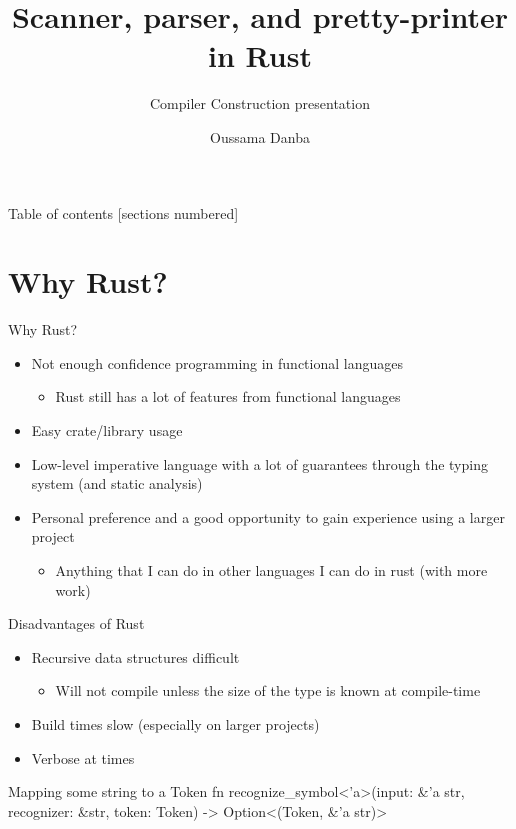\documentclass[10pt]{beamer}
\title{Scanner, parser, and pretty-printer in Rust}
\subtitle{Compiler Construction presentation}
\date{}
\author{Oussama Danba}
\begin{document}
\maketitle

\begin{frame}{Table of contents}
  [sections numbered]
  \tableofcontents[hideallsubsections]
\end{frame}

\section{Why Rust?}
\begin{frame}{Why Rust?}
    \begin{itemize}
    \item Not enough confidence programming in functional languages
        \begin{itemize}
            \item Rust still has a lot of features from functional languages
        \end{itemize}
    \item Easy crate/library usage
    \item Low-level imperative language with a lot of guarantees through the typing system (and static analysis)
    \item Personal preference and a good opportunity to gain experience using a larger project
        \begin{itemize}
            \item Anything that I can do in other languages I can do in rust (with more work)
        \end{itemize}
\end{itemize}
\end{frame}

\begin{frame}{Disadvantages of Rust}
    \begin{itemize}
        \item Recursive data structures difficult
            \begin{itemize}
                \item Will not compile unless the size of the type is known at compile-time
            \end{itemize}
        \item Build times slow (especially on larger projects)
        \item Verbose at times
    \end{itemize}
    
      \begin{block}{Mapping some string to a Token}
        fn recognize\_symbol<'a>(input: \&'a str, recognizer: \&str, token: Token) -> Option<(Token, \&'a str)>
      \end{block}
\end{frame}
\end{document}
